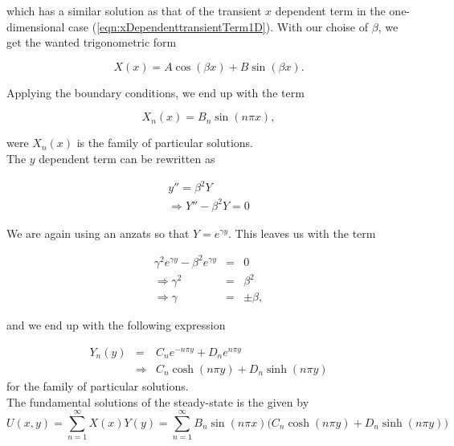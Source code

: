 \documentclass{article}
\begin{document}
which has a similar solution as that of the transient $x$ dependent term in the one-dimensional case (\ref{eqn:xDependenttransientTerm1D}). With our choise of $\beta$, we get the wanted trigonometric form

\begin{equation}
X(x) = A\cos(\beta x) + B\sin(\beta x) \nonumber.
\end{equation}

Applying the boundary conditions, we end up with the term

\begin{equation}
X_n(x) = B_n\sin(n\pi x),
\label{eqn:xDependenSteadyState2D}
\end{equation}

were ${X_n(x)}$ is the family of particular solutions.\\

The $y$ dependent term can be rewritten as 

\begin{subequations}
	\begin{eqnarray}
	y'' = \beta^2 Y \\ 
	\Rightarrow Y'' - \beta^2 Y = 0 
	\end{eqnarray}
\end{subequations}

We are again using an anzats so that $Y = e^{\gamma y}$. This leaves us with the term

\begin{subequations}
	\begin{eqnarray}
	\gamma^2 e^{\gamma y} - \beta^2 e^{\gamma y} &=& 0 \\ 
	\Rightarrow \gamma^2 &=& \beta^2 \\ 
	\Rightarrow \gamma &=& \pm \beta,
	\end{eqnarray}
\end{subequations}

and we end up with the following expression

\begin{eqnarray}
Y_n(y) &=& C_ne^{-n\pi y} + D_ne^{n\pi y} \\ 
&\Rightarrow & C_n\cosh(n\pi y) + D_n\sinh(n\pi y)
\end{eqnarray}
for the family of particular solutions.
\\

The fundamental solutions of the steady-state is the given by
\begin{equation}
U(x,y) = \sum_{n=1}^{\infty} X(x)Y(y) = \sum_{n=1}^{\infty} B_n\sin(n\pi x)\Big(C_n\cosh(n\pi y) + D_n\sinh(n\pi y)\Big)
\end{equation}
\end{document}
